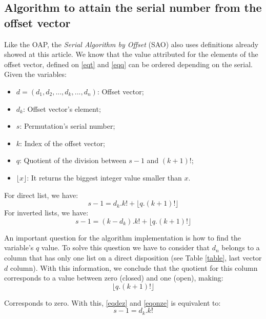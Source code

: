 \documentclass {amsart}
\begin{document}
\subsection*{Algorithm to attain the serial number from the offset vector}
Like the OAP, the \emph{Serial Algorithm by Offset} (SAO) also
uses definitions already showed at this article. We know that the
value attributed for the elements of the offset vector, defined on
\ref{eqt} and \ref{eqq} can be ordered depending on the serial.
Given the variables:
\begin{itemize}
    \item {$d = (d_1,d_2,...,d_k,..., d_n)$}: Offset vector;
    \item {$d_k$}: Offset vector's element;
    \item {$s$}: Permutation's serial number;
    \item {$k$}: Index of the offset vector;
    \item {$q$}: Quotient of the division between {$s-1$} and {$(k+1)!$};
    \item {$\lfloor x \rfloor$}: It returns the biggest integer value smaller than {$x$}.
\end{itemize}
For direct list, we have:
\begin{equation} \label{eqdez}
s-1 = d_k . k! + \lfloor q . (k+1)! \rfloor
\end{equation}
For inverted lists, we have:
\begin{equation} \label{eqonze}
s-1 = (k - d_k). k! + \lfloor q . (k+1)! \rfloor
\end{equation}

An important question for the algorithm implementation is how to
find the variable's {$q$} value. To solve this question we have to
consider that {$d_n$} belongs to a column that has only one list
on a direct disposition (see Table \ref{table}, last vector {$d$}
column). With this information, we conclude that the quotient for
this column corresponds to a value between zero (closed) and one
(open), making:
\begin{equation}
\lfloor q . (k+1)! \rfloor
\end{equation}

Corresponds to zero. With this,  \ref{eqdez} and \ref{eqonze} is
equivalent to:
\begin{equation}  \label{eqdoze}
 s-1 = d_k . k!
\end{equation}
\end{document}
